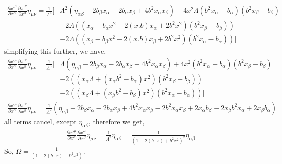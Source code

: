 \documentclass[]{article}
\numberwithin{equation}{section}
\begin{document}
\begin{align*}
    \frac{\partial {x'}^\mu}{\partial {x}^\alpha}\frac{\partial {x'}^\nu}{\partial {x}^\beta}\eta_{\mu\nu}=\frac{1}{\Lambda^4}\bigg[&\Lambda^2\left(\eta_{\alpha\beta}-2b_\beta x_\alpha-2b_\alpha x_\beta+4b^2x_\alpha x_\beta\right)+4x^2\Lambda\left(b^2x_\alpha-b_\alpha\right)\left(b^2x_\beta-b_\beta\right)\\
    &-2\Lambda\left(\left(x_\alpha-b_\alpha x^2-2(x.b)x_\alpha+2b^2x^2\right)\left(b^2x_\beta-b_\beta\right)\right)\\
    &-2\Lambda\left(\left(x_\beta-b_\beta x^2-2(x.b)x_\beta+2b^2x^2\right)\left(b^2x_\alpha-b_\alpha\right)\right)\bigg]
\end{align*}
simplifying this further, we have,
\begin{align*}
    \frac{\partial {x'}^\mu}{\partial {x}^\alpha}\frac{\partial {x'}^\nu}{\partial {x}^\beta}\eta_{\mu\nu}=\frac{1}{\Lambda^3}\bigg[&\Lambda\left(\eta_{\alpha\beta}-2b_\beta x_\alpha-2b_\alpha x_\beta+4b^2x_\alpha x_\beta\right)+4x^2\left(b^2x_\alpha-b_\alpha\right)\left(b^2x_\beta-b_\beta\right)\\
    &-2\left(\left(x_\alpha\Lambda+\left(x_\alpha b^2-b_\alpha\right)x^2\right)\left(b^2x_\beta-b_\beta\right)\right)\\
    &-2\left(\left(x_\beta\Lambda+\left(x_\beta b^2-b_\beta\right)x^2\right)\left(b^2x_\alpha-b_\alpha\right)\right)\bigg]
\end{align*}
\begin{align}
    \frac{\partial {x'}^\mu}{\partial {x}^\alpha}\frac{\partial {x'}^\nu}{\partial {x}^\beta}\eta_{\mu\nu}=\frac{1}{\Lambda^2}\left(\eta_{\alpha\beta}-2b_\beta x_\alpha-2b_\alpha x_\beta+4b^2x_\alpha x_\beta-2b^2x_\alpha x_\beta+2x_\alpha b_\beta-2x_\beta b^2x_\alpha+2x_\beta b_\alpha\right)
\end{align}
all terms cancel, except $\eta_{\alpha\beta}$, therefore we get,
\begin{align}
    \frac{\partial {x'}^\mu}{\partial {x}^\alpha}\frac{\partial {x'}^\nu}{\partial {x}^\beta}\eta_{\mu\nu}=\frac{1}{\Lambda^2}\eta_{\alpha\beta}=\frac{1}{(1-2(b\cdot x)+b^2x^2)^2}\eta_{\alpha\beta}
\end{align}
So, $\boxed{\Omega=\frac{1}{(1-2(b\cdot x)+b^2x^2)}}$.
\end{document}
